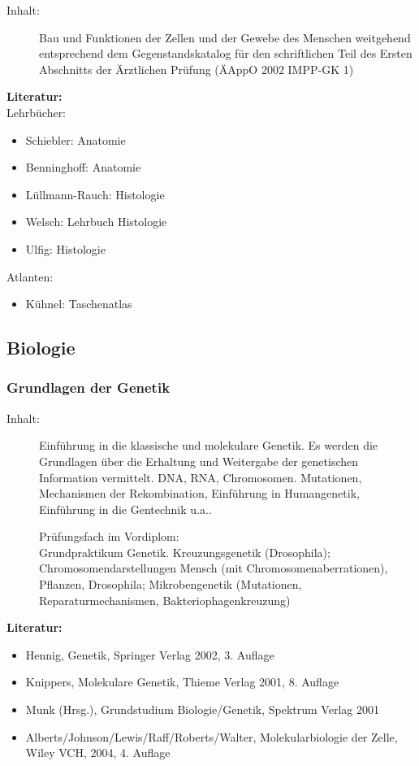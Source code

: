 \documentclass[%
a4paper, %
11pt,               %
leqno,              %
fleqn,              %
]
{scrartcl}
\begin{document}
\begin{description}
  \item[Inhalt:] Bau und Funktionen der Zellen und der Gewebe des Menschen
    weitgehend entsprechend dem Gegenstandskatalog für den schriftlichen Teil
    des Ersten Abschnitts der Ärztlichen Prüfung (ÄAppO 2002 IMPP-GK 1)
\end{description}
\textsf{\textbf{Literatur:}}\\
Lehrbücher:
\begin{itemize}\itemsep0pt
  \item Schiebler: Anatomie
  \item Benninghoff: Anatomie
  \item Lüllmann-Rauch: Histologie
  \item Welsch: Lehrbuch Histologie
  \item Ulfig: Histologie
\end{itemize}
Atlanten:
\begin{itemize}\itemsep0pt
  \item Kühnel: Taschenatlas
\end{itemize}



\subsection{Biologie} %
\label{sub:Biologie}

\subsubsection{Grundlagen der Genetik} %
\label{ssub:Grundlagen der Genetik}

\begin{description}
  \item[Inhalt:] Einführung in die klassische und molekulare Genetik. Es werden
    die Grundlagen über die Erhaltung und Weitergabe der genetischen Information
    vermittelt. DNA, RNA, Chromosomen. Mutationen, Mechanismen der
    Rekombination, Einführung in Humangenetik, Einführung in die Gentechnik
    u.a..

    Prüfungsfach im Vordiplom:\\
    Grundpraktikum Genetik. Kreuzungsgenetik (Drosophila);
    Chromosomendarstellungen Mensch (mit Chromosomenaberrationen), Pflanzen,
    Drosophila; Mikrobengenetik (Mutationen, Reparaturmechanismen,
    Bakteriophagenkreuzung)
\end{description}
\textsf{\textbf{Literatur:}}
\begin{itemize}\itemsep0pt
  \item Hennig, Genetik, Springer Verlag 2002, 3. Auflage
  \item Knippers, Molekulare Genetik, Thieme Verlag 2001, 8. Auflage
  \item Munk (Hrsg.), Grundstudium Biologie/Genetik, Spektrum Verlag 2001
  \item Alberts/Johnson/Lewis/Raff/Roberts/Walter, Molekularbiologie der Zelle,
    Wiley VCH, 2004, 4. Auflage
\end{itemize}
\end{document}
